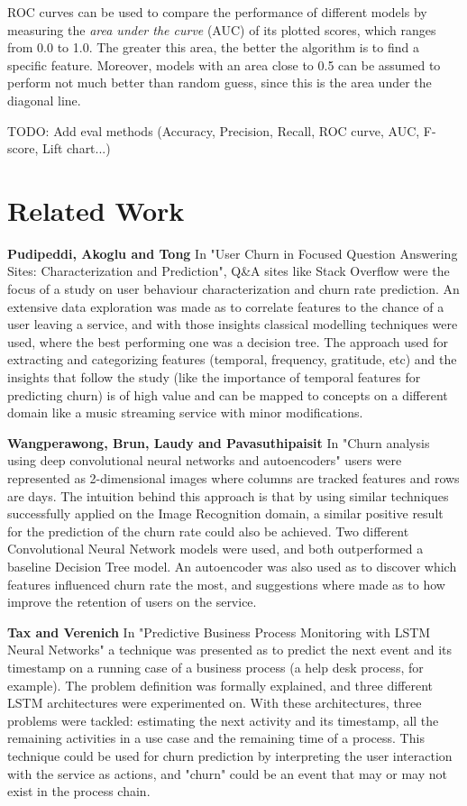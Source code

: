 \documentclass{kththesis}
\begin{document}
ROC curves can be used to compare the performance of different models by measuring the \emph{area under the curve} (AUC) of its plotted scores, which ranges from 0.0 to 1.0. The greater this area, the better the algorithm is to find a specific feature. Moreover, models with an area close to 0.5 can be assumed to perform not much better than random guess, since this is the area under the diagonal line.

TODO: Add eval methods (Accuracy, Precision, Recall, ROC curve, AUC, F-score, Lift chart...)

\chapter{Related Work}

\textbf{Pudipeddi, Akoglu and Tong} \citep{Pudipeddi2014} In "User Churn in Focused Question Answering Sites: Characterization and Prediction", Q\&A sites like Stack Overflow were the focus of a study on user behaviour characterization and churn rate prediction. An extensive data exploration was made as to correlate features to the chance of a user leaving a service, and with those insights classical modelling techniques were used, where the best performing one was a decision tree. The approach used for extracting and categorizing features (temporal, frequency, gratitude, etc) and the insights that follow the study (like the importance of temporal features for predicting churn) is of high value and can be mapped to concepts on a different domain like a music streaming service with minor modifications.

\textbf{Wangperawong, Brun, Laudy and Pavasuthipaisit} \citep{Wangperawong2016} In "Churn analysis using deep convolutional neural networks and autoencoders" users were represented as 2-dimensional images where columns are tracked features and rows are days. The intuition behind this approach is that by using similar techniques successfully applied on the Image Recognition domain, a similar positive result for the prediction of the churn rate could also be achieved. Two different Convolutional Neural Network models were used, and both outperformed a baseline Decision Tree model. An autoencoder was also used as to discover which features influenced churn rate the most, and suggestions where made as to how improve the retention of users on the service.

\textbf{Tax and Verenich} \citep{Tax2016} In "Predictive Business Process Monitoring with LSTM Neural Networks" a technique was presented as to predict the next event and its timestamp on a running case of a business process (a help desk process, for example). The problem definition was formally explained, and three different LSTM architectures were experimented on. With these architectures, three problems were tackled: estimating the next activity and its timestamp, all the remaining activities in a use case and the remaining time of a process. This technique could be used for churn prediction by interpreting the user interaction with the service as actions, and "churn" could be an event that may or may not exist in the process chain.
\end{document}
